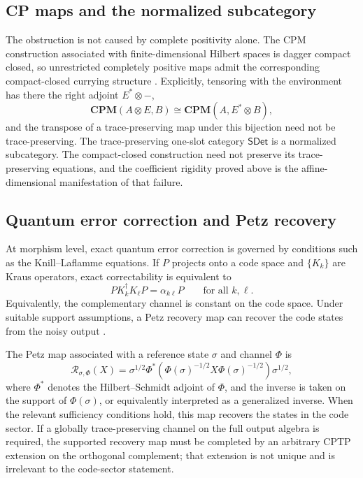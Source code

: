 \documentclass[11pt,a4paper]{article}
\theoremstyle{definition}
\theoremstyle{plain}
\theoremstyle{remark}
\newcommand{\SDet}{\mathsf{SDet}}
\begin{document}
\subsection{CP maps and the normalized subcategory}

The obstruction is not caused by complete positivity alone. The CPM construction associated with finite-dimensional Hilbert spaces is dagger compact closed, so unrestricted completely positive maps admit the corresponding compact-closed currying structure \cite{selinger2007,coeckekissinger2017}. Explicitly, tensoring with the environment has there the right adjoint $E^*\otimes-$,
\[
\mathbf{CPM}(A\otimes E,B)\cong\mathbf{CPM}(A,E^*\otimes B),
\]
and the transpose of a trace-preserving map under this bijection need not be trace-preserving. The trace-preserving one-slot category $\SDet$ is a normalized subcategory. The compact-closed construction need not preserve its trace-preserving equations, and the coefficient rigidity proved above is the affine-dimensional manifestation of that failure.

\subsection{Quantum error correction and Petz recovery}

At morphism level, exact quantum error correction is governed by conditions such as the Knill--Laflamme equations. If $P$ projects onto a code space and $\{K_k\}$ are Kraus operators, exact correctability is equivalent to
\[
 P K_k^\dagger K_\ell P=\alpha_{k\ell}P
\qquad\text{for all }k,\ell.
\]
Equivalently, the complementary channel is constant on the code space. Under suitable support assumptions, a Petz recovery map can recover the code states from the noisy output \cite{petz1986,knilllaflamme1997,hayden2004}.

The Petz map associated with a reference state $\sigma$ and channel $\Phi$ is
\[
\mathcal R_{\sigma,\Phi}(X)
=
\sigma^{1/2}\Phi^*\!\left(
\Phi(\sigma)^{-1/2}X\Phi(\sigma)^{-1/2}
\right)\sigma^{1/2},
\]
where $\Phi^*$ denotes the Hilbert--Schmidt adjoint of $\Phi$, and the inverse is taken on the support of $\Phi(\sigma)$, or equivalently interpreted as a generalized inverse. When the relevant sufficiency conditions hold, this map recovers the states in the code sector. If a globally trace-preserving channel on the full output algebra is required, the supported recovery map must be completed by an arbitrary CPTP extension on the orthogonal complement; that extension is not unique and is irrelevant to the code-sector statement.
\end{document}

